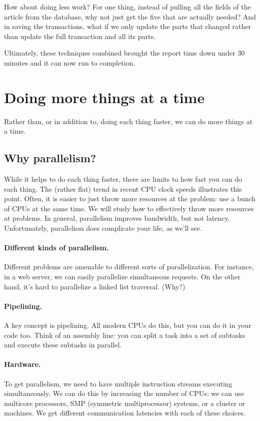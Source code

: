 How about doing less work? For one thing, instead of pulling all the fields of the article from the database, why not just get the five that are actually needed? And in saving the transactions, what if we only update the parts that changed rather than update the full transaction and all its parts. 

Ultimately, these techniques combined brought the report time down under 30 minutes and it can now run to completion. 

\section*{Doing more things at a time} 
Rather than, or in addition to, doing each thing faster, we can do
more things at a time.

\subsection*{Why parallelism?}
While it helps to do each thing faster, there are limits to how fast
you can do each thing. The (rather flat) trend in recent CPU clock
speeds illustrates this point.  Often, it is easier to just throw more
resources at the problem: use a bunch of CPUs at the same time. We
will study how to effectively throw more resources at problems.
In general, parallelism improves bandwidth, but not latency.
Unfortunately, parallelism does complicate your life, as we'll see.

\paragraph{Different kinds of parallelism.} Different problems are amenable
to different sorts of parallelization. For instance, in a web server, we
can easily parallelize simultaneous requests. On the other hand, it's hard
to parallelize a linked list traversal. (Why?)

\paragraph{Pipelining.} A key concept is pipelining. All modern CPUs do this,
but you can do it in your code too. Think of an assembly line: you can split
a task into a set of subtasks and execute these subtasks in parallel.

\paragraph{Hardware.} To get parallelism, we need to have multiple instruction
streams executing simultaneously. We can do this by increasing the
number of CPUs: we can use multicore processors, SMP (symmetric
multiprocessor) systems, or a cluster or machines. We get different
communication latencies with each of these choices.

